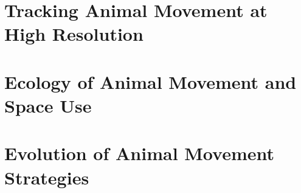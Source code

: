 \documentclass[ twoside,openright,titlepage,numbers=noenddot,%
                headinclude,footinclude,cleardoublepage=empty,abstract=on,
                BCOR=5mm,paper=b5,fontsize=10pt,dvipsnames
                ]{scrreprt}
\begin{document}
\part{Tracking Animal Movement at High Resolution}



\cleardoublepage




\cleardoublepage

\part{Ecology of Animal Movement and Space Use}



\cleardoublepage



\cleardoublepage



\part{Evolution of Animal Movement Strategies}







% 
% 



\appendix
\cleardoublepage
\end{document}

